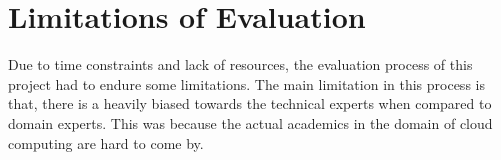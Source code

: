 
\section{Limitations of Evaluation}

Due to time constraints and lack of resources, the evaluation process of this project had to endure some limitations. The main limitation in this process is that, there is a heavily biased towards the technical experts when compared to domain experts. This was because the actual academics in the domain of cloud computing are hard to come by.